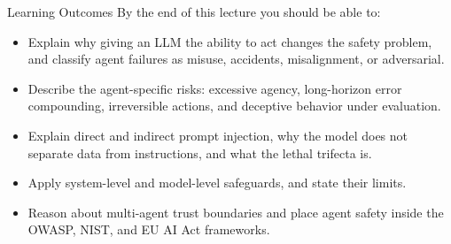 \begin{frame}{Learning Outcomes}
  By the end of this lecture you should be able to:
  \begin{itemize}\itemsep0.5em
    \item[\textcolor{KAred}{$\blacktriangleright$}] Explain why giving an LLM the ability to act changes the safety problem, and classify agent failures as misuse, accidents, misalignment, or adversarial.
    \item[\textcolor{KAred}{$\blacktriangleright$}] Describe the agent-specific risks: excessive agency, long-horizon error compounding, irreversible actions, and deceptive behavior under evaluation.
    \item[\textcolor{KAred}{$\blacktriangleright$}] Explain direct and indirect prompt injection, why the model does not separate data from instructions, and what the lethal trifecta is.
    \item[\textcolor{KAred}{$\blacktriangleright$}] Apply system-level and model-level safeguards, and state their limits.
    \item[\textcolor{KAred}{$\blacktriangleright$}] Reason about multi-agent trust boundaries and place agent safety inside the OWASP, NIST, and EU AI Act frameworks.
  \end{itemize}
\end{frame}
